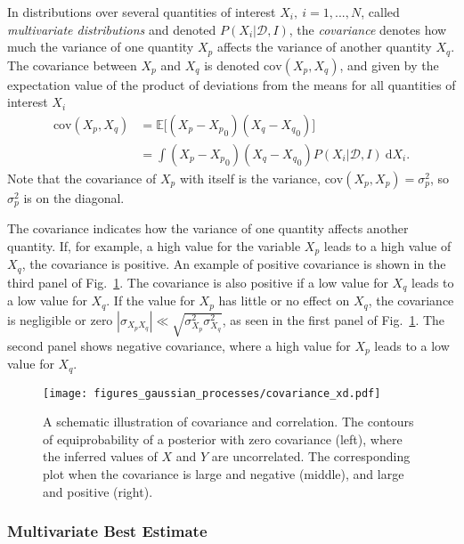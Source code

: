 \documentclass[twoside,english]{uiofysmaster}
\begin{document}
{{In distributions over several quantities of interest $X_i,~i=1,...,N$, called \textit{multivariate distributions} and denoted $P(X_i| \mathcal{D}, I)$, the \textit{covariance} denotes how much the variance of one quantity $X_p$ affects the variance of another quantity $X_q$. The covariance between $X_p$ and $X_q$ is denoted $\mathrm{cov}(X_p, X_q)$, and given by the expectation value of the product of deviations from the means for all quantities of interest $X_i$ 
\begin{align}\label{Eq:: gaussian process : Covariance definition}
\mathrm{cov}(X_p, X_q) &= \mathbb{E} \big[(X_p - {X_p}_0) (X_q - {X_q}_0) \big] \nonumber \\&=\int (X_p - {X_p}_0) (X_q - {X_q}_0) P (X_i | \mathcal{D}, I) ~\text{d}X_i.
\end{align}
Note that the covariance of $X_p$ with itself is the variance, $\mathrm{cov}(X_p, X_p) = \sigma_p^2$, so $\sigma_p^2$ is on the diagonal.

The covariance indicates how the variance of one quantity affects another quantity. If, for example, a high value for the variable $X_p$ leads to a high value of $X_q$, the covariance is positive. An example of positive covariance is shown in the third panel of Fig.~\ref{Fig:: gaussian process : Covariance illustrated}. The covariance is also positive if a low value for $X_q$ leads to a low value for $X_q$. If the value for $X_p$ has little or no effect on $X_q$, the covariance is negligible or zero $|\sigma_{X_pX_q}| \ll \sqrt{\sigma_{X_p}^2 \sigma_{X_q}^2}$, as seen in the first panel of Fig.~\ref{Fig:: gaussian process : Covariance illustrated}. The second panel shows negative covariance, where a high value for $X_p$ leads to a low value for $X_q$.


\begin{figure}
\centering
\texttt{[image: figures\_gaussian\_processes/covariance\_xd.pdf]}
\caption[An illustration of covariance]{A schematic illustration of covariance and correlation. The contours of equiprobability of a posterior with zero covariance (left), where the inferred values of $X$ and $Y$ are uncorrelated. The corresponding plot when the covariance is large and negative (middle), and large and positive (right).}
\label{Fig:: gaussian process : Covariance illustrated}
\end{figure}

\subsubsection{Multivariate Best Estimate}

}}
\end{document}
